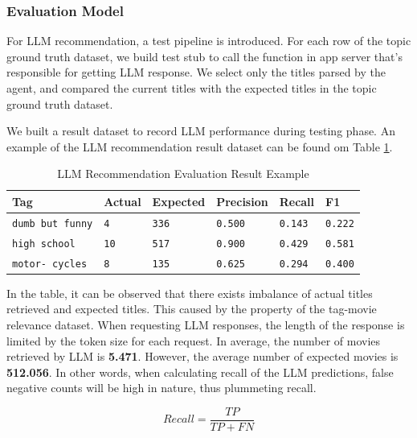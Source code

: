 \documentclass[journal]{IEEEtran}
\theoremstyle{mydefstyle}
\begin{document}
\subsubsection{Evaluation Model} For LLM recommendation, a test pipeline is introduced. For each row of the topic ground truth dataset, we build test stub to call the function in app server that's responsible for getting LLM response. We select only the titles parsed by the agent, and compared the current titles with the expected titles in the topic ground truth dataset.

We built a result dataset to record LLM performance during testing phase. An example of the LLM recommendation result dataset can be found om Table \ref{tab:evaluation_matrix}.


\begin{table}[ht]
\centering
\scriptsize
\caption{LLM Recommendation Evaluation Result Example}
\label{tab:evaluation_matrix}
\begin{tabular}{|>{\centering\arraybackslash}m{1cm}|>{\centering\arraybackslash}m{1cm}|>{\centering\arraybackslash}m{1cm}|>{\centering\arraybackslash}m{1.0cm}|>{\centering\arraybackslash}m{1.0cm}|>{\centering\arraybackslash}m{1.0cm}|}
\hline
\textbf{Tag} & \textbf{Actual} & \textbf{Expected} & \textbf{Precision} & \textbf{Recall} & \textbf{F1} \\
\hline
\texttt{dumb but funny} & \texttt{4} & \texttt{336} & \texttt{0.500} & \texttt{0.143} & \texttt{0.222} \\
\hline
\texttt{high school} & \texttt{10} & \texttt{517} & \texttt{0.900} & \texttt{0.429} & \texttt{0.581} \\
\hline
\texttt{motor- cycles} & \texttt{8} & \texttt{135} & \texttt{0.625} & \texttt{0.294} & \texttt{0.400} \\
\hline
\end{tabular}
\end{table}

In the table, it can be observed that there exists imbalance of actual titles retrieved and expected titles. This caused by the property of the tag-movie relevance dataset. When requesting LLM responses, the length of the response is limited by the token size for each request. In average, the number of movies retrieved by LLM is \textbf{5.471}. However, the average number of expected movies is \textbf{512.056}. In other words, when calculating recall of the LLM predictions, false negative counts will be high in nature, thus plummeting recall. 

\[ 
Recall = \frac{TP}{TP + FN}
\]
\end{document}
